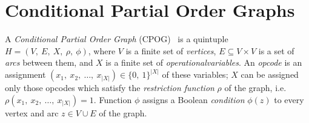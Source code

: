 \section{Conditional Partial Order Graphs\label{sec:CPOG-model-essentials}}

A \emph{Conditional Partial Order Graph} (CPOG)~\cite{2009_mokhov_phd}\cite{2010_mokhov_ieee}
is a quintuple $H=(V,\ E,\ X,\ \rho,\ \phi)$, where $V$ is a finite
set of \emph{vertices}, $E\subseteq V\times V$ is a set of \emph{arcs}
between them, and $X$ is a finite set of \emph{operational}\emph{variables}. An \emph{opcode} is an assignment $(x_{1},\ x_{2},\ \dots,\ x_{|X|})\in\{0,\ 1\}^{|X|}$
of these variables; $X$ can be assigned only those opcodes which
satisfy the \emph{restriction function} $\rho$
of the graph, i.e. $\rho(x_{1},\ x_{2},\ \dots,\ x_{|X|})=1$. Function
$\phi$ assigns a Boolean \emph{condition} $\phi(z)$ to every vertex
and arc $z\in V\cup E$ of the graph.

